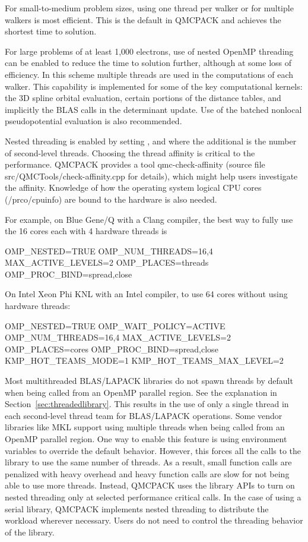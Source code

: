 For small-to-medium problem sizes, using one thread per walker or for multiple walkers is most efficient. This is the default in QMCPACK and achieves the shortest time to solution.

For large problems of at least 1,000 electrons, use of nested OpenMP threading can be enabled to reduce the time to solution further, although at some loss of efficiency. In this scheme multiple threads are used in the computations of each walker. This capability is implemented for some of the key computational kernels: the 3D spline orbital evaluation, certain portions of the distance tables, and implicitly the BLAS calls in the determinant update. Use of the batched nonlocal pseudopotential evaluation is also recommended.

Nested threading is enabled by setting ,  and  where the additional  is the number of second-level threads.  Choosing the thread affinity is critical to the performance.  QMCPACK provides a tool qmc-check-affinity (source file src/QMCTools/check-affinity.cpp for details), which might help users investigate the affinity. Knowledge of how the operating system logical CPU cores (/prco/cpuinfo) are bound to the hardware is also needed.

For example, on Blue Gene/Q with a Clang compiler, the best way to fully use the 16 cores each with 4 hardware threads is
\begin{shade}
OMP_NESTED=TRUE
OMP_NUM_THREADS=16,4
MAX_ACTIVE_LEVELS=2
OMP_PLACES=threads
OMP_PROC_BIND=spread,close
\end{shade}

On Intel Xeon Phi KNL with an Intel compiler, to use 64 cores without using hardware threads:
\begin{shade}
OMP_NESTED=TRUE
OMP_WAIT_POLICY=ACTIVE
OMP_NUM_THREADS=16,4
MAX_ACTIVE_LEVELS=2
OMP_PLACES=cores
OMP_PROC_BIND=spread,close
KMP_HOT_TEAMS_MODE=1
KMP_HOT_TEAMS_MAX_LEVEL=2
\end{shade}

Most multithreaded BLAS/LAPACK libraries do not spawn threads by default
when being called from an OpenMP parallel region. See the explanation in Section~\ref{sec:threadedlibrary}.
This results in the use of only a single thread in each second-level thread team for BLAS/LAPACK operations.
Some vendor libraries like MKL support using multiple threads when being called from an OpenMP parallel region.
One way to enable this feature is using environment variables to override the default behavior.
However, this forces all the calls to the library to use the same number of threads.
As a result, small function calls are penalized with heavy overhead and heavy function calls are slow for not being able to use more threads.
Instead, QMCPACK uses the library APIs to turn on nested threading only at selected performance critical calls.
In the case of using a serial library, QMCPACK implements nested threading to distribute the workload wherever necessary.
Users do not need to control the threading behavior of the library.

